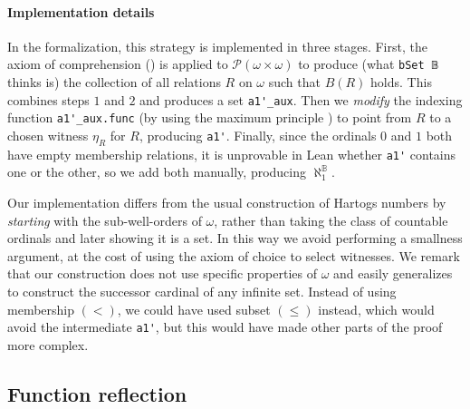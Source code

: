 \documentclass[sigplan,10pt,review]{acmart}
\newcommand{\lil}{\lstinline}
\theoremstyle{definition}
\begin{document}
\paragraph{Implementation details}
In the formalization, this strategy is implemented in three stages.
First, the axiom of comprehension () is applied to \(\mathcal{P}(\omega \times \omega)\) to produce (what \lil{bSet 𝔹} thinks is) the collection of all relations \(R\) on \(\omega\) such that \(B(R)\) holds.
This combines steps \(1\) and \(2\) and produces a set \lil{a1'_aux}. Then we \emph{modify} the indexing function \lil{a1'_aux.func} (by using the maximum principle%
) to point from \(R\) to a chosen witness \(\eta_R\) for \(R\), producing \lil{a1'}.
Finally, since the ordinals \(0\) and \(1\) both have empty membership relations, it is unprovable in Lean whether \lil{a1'} contains one or the other, so we add both manually, producing \(\aleph_1^{\mathbb{B}}\).

Our implementation differs from the usual construction of Hartogs numbers by \emph{starting} with the sub-well-orders of \(\omega\), rather than taking the class of countable ordinals and later showing it is a set. In this way we avoid performing a smallness argument, at the cost of using the axiom of choice to select witnesses. We remark that our construction does not use specific properties of \(\omega\) and easily generalizes to construct the successor cardinal of any infinite set. Instead of using membership \((<)\), we could have used subset \((\leq)\) instead, which would avoid the intermediate \lil{a1'}, but this would have made other parts of the proof more complex.


\subsection{Function reflection} \label{subsect:function-reflection}
\end{document}
